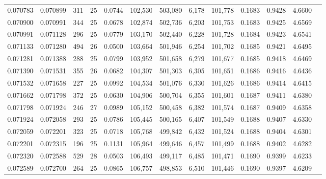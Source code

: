 \begin{tabular}{rrrrrrrrrrrrr}
0.070783 & 0.070899 & 311 &  25 &                                     0.0744 & 102,530 & 503,080 &   6,178 & 101,778 & 0.1683 & 0.9428 & 4.6600 \\
0.070900 & 0.070991 & 344 &  25 &                                     0.0678 & 102,874 & 502,736 &   6,203 & 101,753 & 0.1683 & 0.9425 & 4.6569 \\
0.070991 & 0.071128 & 296 &  25 &                                     0.0779 & 103,170 & 502,440 &   6,228 & 101,728 & 0.1684 & 0.9423 & 4.6541 \\
0.071133 & 0.071280 & 494 &  26 &                                     0.0500 & 103,664 & 501,946 &   6,254 & 101,702 & 0.1685 & 0.9421 & 4.6495 \\
0.071281 & 0.071388 & 288 &  25 &                                     0.0799 & 103,952 & 501,658 &   6,279 & 101,677 & 0.1685 & 0.9418 & 4.6469 \\
0.071390 & 0.071531 & 355 &  26 &                                     0.0682 & 104,307 & 501,303 &   6,305 & 101,651 & 0.1686 & 0.9416 & 4.6436 \\
0.071532 & 0.071658 & 227 &  25 &                                     0.0992 & 104,534 & 501,076 &   6,330 & 101,626 & 0.1686 & 0.9414 & 4.6415 \\
0.071662 & 0.071798 & 372 &  25 &                                     0.0630 & 104,906 & 500,704 &   6,355 & 101,601 & 0.1687 & 0.9411 & 4.6380 \\
0.071798 & 0.071924 & 246 &  27 &                                     0.0989 & 105,152 & 500,458 &   6,382 & 101,574 & 0.1687 & 0.9409 & 4.6358 \\
0.071924 & 0.072058 & 293 &  25 &                                     0.0786 & 105,445 & 500,165 &   6,407 & 101,549 & 0.1688 & 0.9407 & 4.6330 \\
0.072059 & 0.072201 & 323 &  25 &                                     0.0718 & 105,768 & 499,842 &   6,432 & 101,524 & 0.1688 & 0.9404 & 4.6301 \\
0.072201 & 0.072315 & 196 &  25 &                                     0.1131 & 105,964 & 499,646 &   6,457 & 101,499 & 0.1688 & 0.9402 & 4.6282 \\
0.072320 & 0.072588 & 529 &  28 &                                     0.0503 & 106,493 & 499,117 &   6,485 & 101,471 & 0.1690 & 0.9399 & 4.6233 \\
0.072589 & 0.072700 & 264 &  25 &                                     0.0865 & 106,757 & 498,853 &   6,510 & 101,446 & 0.1690 & 0.9397 & 4.6209 \\

\end{tabular}
